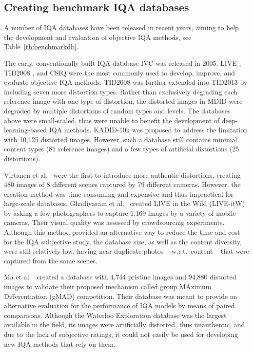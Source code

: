 \documentclass[10pt,journal,compsoc]{IEEEtran}
\begin{document}
\subsection{Creating benchmark IQA databases}
A number of IQA databases have been released in recent years, aiming to help the development and evaluation of objective IQA methods, see Table~\ref{tb:benchmarkdb}. 

The early, conventionally built IQA database IVC \cite{ivcdb} was released in 2005. LIVE \cite{sheikh:2006statistical}, TID2008 \cite{ponomarenko:2009tid2008}, and CSIQ \cite{larson:2010most} were the most commonly used to develop, improve, and evaluate objective IQA methods. TID2008 was further extended into TID2013 \cite{ponomarenko:2015image} by including seven more distortion types. Rather than exclusively degrading each reference image with one type of distortion, the distorted images in MDID \cite{sun2017mdid} were degraded by multiple distortions of random types and levels. The databases above were small-scaled, thus were unable to benefit the development of deep-learning-based IQA methods. KADID-10k \cite{lin2019kadid} was proposed to address the limitation with 10,125 distorted images. However, such a database still contains minimal content types (81 reference images) and a few types of artificial distortions (25 distortions).

Virtanen et al.\ \cite{virtanen2015cid2013} were the first to introduce more authentic distortions, creating 480 images of 8 different scenes captured by 79 different cameras. However, the creation method was time-consuming and expensive and thus impractical for large-scale databases. Ghadiyaram et al.\ \cite{ghadiyaram:2016massive} created LIVE in the Wild (LIVE-itW) by asking a few photographers to capture 1,169 images by a variety of mobile cameras. Their visual quality was assessed by crowdsourcing experiments. Although this method provided an alternative way to reduce the time and cost for the IQA subjective study, the database size, as well as the content diversity, were still relatively low, having near-duplicate photos -- w.r.t.\ content -- that were captured from the same scenes.

Ma et al.\ \cite{ma2016group} created a database with 4,744 pristine images and 94,880 distorted images to validate their proposed mechanism called group MAximum Differentiation (gMAD) competition. Their database was meant to provide an alternative evaluation for the performance of IQA models by means of paired comparisons. Although the Waterloo Exploration database was the largest available in the field, its images were artificially distorted, thus unauthentic, and due to the lack of subjective ratings, it could not easily be used for developing new IQA methods that rely on them.
\end{document}

